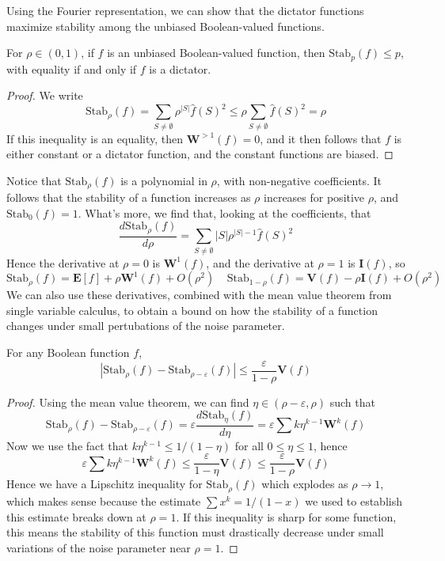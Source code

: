 Using the Fourier representation, we can show that the dictator functions maximize stability among the unbiased Boolean-valued functions.

\begin{theorem}
    For $\rho \in (0,1)$, if $f$ is an unbiased Boolean-valued function, then $\text{Stab}_p(f) \leq p$, with equality if and only if $f$ is a dictator.
\end{theorem}
\begin{proof}
    We write
    \[ \text{Stab}_\rho(f) = \sum_{S \neq \emptyset} \rho^{|S|} \widehat{f}(S)^2 \leq \rho \sum_{S \neq \emptyset} \widehat{f}(S)^2 = \rho \]
    If this inequality is an equality, then $\mathbf{W}^{> 1}(f) = 0$, and it then follows that $f$ is either constant or a dictator function, and the constant functions are biased.
\end{proof}

Notice that $\text{Stab}_\rho(f)$ is a polynomial in $\rho$, with non-negative coefficients. It follows that the stability of a function increases as $\rho$ increases for positive $\rho$, and $\text{Stab}_0(f) = 1$. What's more, we find that, looking at the coefficients, that
%
\[ \frac{d\text{Stab}_\rho(f)}{d\rho} = \sum_{S \neq \emptyset} |S| \rho^{|S| - 1} \widehat{f}(S)^2 \]
%
Hence the derivative at $\rho = 0$ is $\mathbf{W}^1(f)$, and the derivative at $\rho = 1$ is $\mathbf{I}(f)$, so
%
\[ \text{Stab}_\rho(f) = \mathbf{E}[f] + \rho \mathbf{W}^1(f) + O(\rho^2)\ \ \ \ \ \text{Stab}_{1-\rho}(f) = \mathbf{V}(f) - \rho \mathbf{I}(f) + O(\rho^2) \]
%
We can also use these derivatives, combined with the mean value theorem from single variable calculus, to obtain a bound on how the stability of a function changes under small pertubations of the noise parameter.

\begin{theorem}
    For any Boolean function $f$,
    \[ |\text{Stab}_\rho(f) - \text{Stab}_{\rho - \varepsilon}(f)| \leq \frac{\varepsilon}{1 - \rho} \mathbf{V}(f) \]
\end{theorem}
\begin{proof}
    Using the mean value theorem, we can find $\eta \in (\rho - \varepsilon, \rho)$ such that
    \[ \text{Stab}_\rho(f) - \text{Stab}_{\rho - \varepsilon}(f) = \varepsilon \frac{d \text{Stab}_\eta(f)}{d \eta} = \varepsilon \sum k \eta^{k - 1} \mathbf{W}^k(f) \]
    Now we use the fact that $k \eta^{k-1} \leq 1/(1 - \eta)$ for all $0 \leq \eta \leq 1$, hence
    \[ \varepsilon \sum k \eta^{k-1} \mathbf{W}^k(f) \leq \frac{\varepsilon}{1 - \eta} \mathbf{V}(f) \leq \frac{\varepsilon}{1 - \rho} \mathbf{V}(f) \]
    Hence we have a Lipschitz inequality for $\text{Stab}_\rho(f)$ which explodes as $\rho \to 1$, which makes sense because the estimate $\sum x^k = 1/(1 - x)$ we used to establish this estimate breaks down at $\rho = 1$. If this inequality is sharp for some function, this means the stability of this function must drastically decrease under small variations of the noise parameter near $\rho = 1$.
\end{proof}

